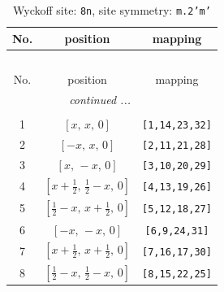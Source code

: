 \documentclass[fleqn,8pt]{jsarticle}
\begin{document}
\begin{longtable}{ccc}
\caption{Wyckoff site: {\tt 8n}, site symmetry: {\tt m.2'm'}}
 \\
 \hline \hline
No. & position & mapping \\ \hline \endfirsthead

\multicolumn{2}{l}{\tablename\ \thetable{}} \\
 \hline \hline
No. & position & mapping \\ \hline \endhead

 \hline \hline
\multicolumn{2}{r}{\footnotesize\it continued ...} \\ \endfoot

 \hline \hline
\multicolumn{2}{r}{} \\ \endlastfoot

1 & $\left[ x,\, x,\, 0 \right]$ & {\tt [1,14,23,32]} \\ \hline
2 & $\left[ - x,\, x,\, 0 \right]$ & {\tt [2,11,21,28]} \\ \hline
3 & $\left[ x,\, - x,\, 0 \right]$ & {\tt [3,10,20,29]} \\ \hline
4 & $\left[ x + \frac{1}{2},\, \frac{1}{2} - x,\, 0 \right]$ & {\tt [4,13,19,26]} \\ \hline
5 & $\left[ \frac{1}{2} - x,\, x + \frac{1}{2},\, 0 \right]$ & {\tt [5,12,18,27]} \\ \hline
6 & $\left[ - x,\, - x,\, 0 \right]$ & {\tt [6,9,24,31]} \\ \hline
7 & $\left[ x + \frac{1}{2},\, x + \frac{1}{2},\, 0 \right]$ & {\tt [7,16,17,30]} \\ \hline
8 & $\left[ \frac{1}{2} - x,\, \frac{1}{2} - x,\, 0 \right]$ & {\tt [8,15,22,25]} \\
\end{longtable}
\renewcommand{\arraystretch}{1.2}
\end{document}
